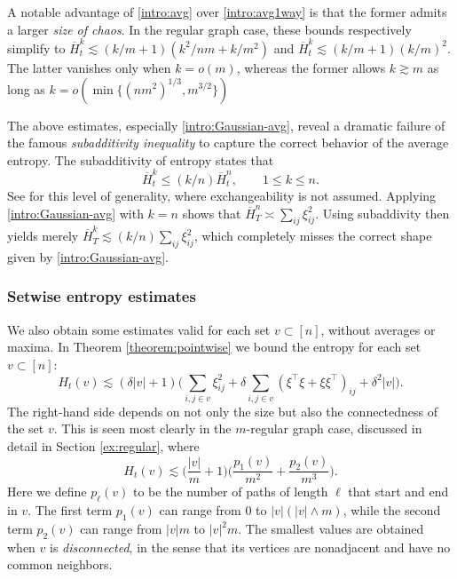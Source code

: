 \documentclass[11pt,reqno]{amsart}
\numberwithin{equation}{section}
\theoremstyle{definition}
\begin{document}
A notable advantage of \eqref{intro:avg} over \eqref{intro:avg1way} is that the former admits a larger \emph{size of chaos}. In the regular graph case, these bounds respectively simplify to  $\overline{H}^k_t \lesssim (k/m+1)(k^2/nm+k/m^2)$ and $\overline{H}^k_t \lesssim (k/m+1)(k/m)^2$. The latter vanishes only when $k=o(m)$, whereas the former allows $k \gtrsim m$ as long as $k = o(\min\{(nm^2)^{1/3},m^{3/2}\})$




The above estimates, especially \eqref{intro:Gaussian-avg}, reveal a dramatic failure of the famous \emph{subadditivity inequality} to capture the correct behavior of the average entropy. The subadditivity of entropy states that
\begin{equation*}
\overline{H}^{k}_t \le (k/n)\overline{H}^n_t, \qquad 1 \le k \le n.
\end{equation*}
See \cite[Theorem 1]{dembo1991information} for this level of generality, where exchangeability is not assumed. Applying \eqref{intro:Gaussian-avg} with $k=n$ shows that $\overline{H}^n_{T} \asymp \sum_{ij}\xi_{ij}^2$. Using subaddivity then yields merely $\overline{H}^{k}_{T}  \lesssim (k/n)\sum_{ij}\xi_{ij}^2$, which completely misses the correct shape given by \eqref{intro:Gaussian-avg}.



\subsubsection{Setwise entropy estimates} 

We also obtain some estimates valid for each set $v \subset [n]$, without averages or maxima. In Theorem \ref{theorem:pointwise} we bound the entropy for each set $v \subset [n]$: 
\begin{equation}
H_t(v) \lesssim (\delta|v|+1)\bigg(\sum_{i,j\in v}\xi^2_{ij} + \delta \sum_{i,j \in v}(\xi^\top \xi+\xi\xi^\top)_{ij}  + \delta^2|v|\bigg). \label{intro:pointwise-v}
\end{equation} 
The right-hand side depends on not only the size but also the connectedness of the set $v$. This is seen most clearly in the $m$-regular graph case, discussed in detail in Section \ref{ex:regular}, where
\begin{equation}
H_t(v) \lesssim  \bigg(\frac{|v|}{m} + 1\bigg)\bigg(\frac{p_1(v)}{m^2}  + \frac{p_2(v)}{m^3}\bigg). \label{intro:pointwise-v-mregular}
\end{equation}
Here we define $p_\ell(v)$ to be the number of paths of length $\ell$ that start and end in $v$. 
The first term $p_1(v)$ can range from 0 to $|v|(|v| \wedge m)$, while the second term $p_2(v)$ can range from $|v|m$ to $|v|^2m$.
The smallest values are obtained when $v$ is \emph{disconnected}, in the sense that its vertices are nonadjacent and have no common neighbors.
\end{document}
